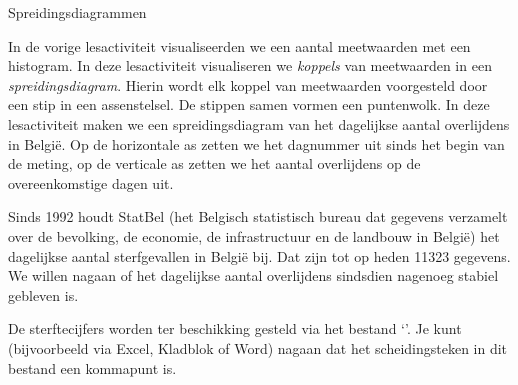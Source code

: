 \begin{lesactiviteit}{Spreidingsdiagrammen}
    
   In de vorige lesactiviteit visualiseerden we een aantal meetwaarden met een histogram. In deze lesactiviteit visualiseren we \emph{koppels} van meetwaarden in een \emph{spreidingsdiagram}. Hierin wordt elk koppel van meetwaarden voorgesteld door een stip in een assenstelsel. De stippen samen vormen een puntenwolk. In deze lesactiviteit maken we een spreidingsdiagram van het dagelijkse aantal overlijdens in België. Op de horizontale as zetten we het dagnummer uit sinds het begin van de meting, op de verticale as zetten we het aantal overlijdens op de overeenkomstige dagen uit.

   Sinds 1992 houdt StatBel (het Belgisch statistisch bureau dat gegevens verzamelt over de bevolking, de economie, de infrastructuur en de landbouw in België) het dagelijkse aantal sterfgevallen in België bij. Dat zijn tot op heden \num{11323} gegevens. We willen nagaan of het dagelijkse aantal overlijdens sindsdien nagenoeg stabiel gebleven is. 
   
   De sterftecijfers worden ter beschikking gesteld via het bestand `'. Je kunt (bijvoorbeeld via Excel, Kladblok of Word) nagaan dat het scheidingsteken in dit bestand een kommapunt is. 

    \begin{vraagenantwoord}
    
    
    


\end{vraagenantwoord}
\end{lesactiviteit}
